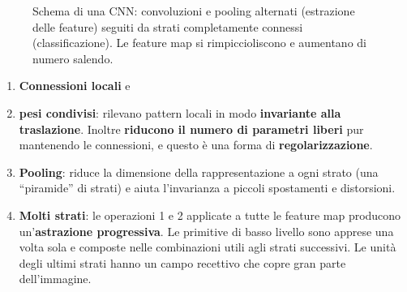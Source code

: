 \begin{figure}[ht]
\centering
{}
\caption{Schema di una CNN: convoluzioni e pooling alternati (estrazione delle feature) seguiti da strati completamente
connessi (classificazione). Le feature map si rimpiccioliscono e aumentano di numero salendo.}
\label{fig:cnn}
\end{figure}

\begin{idea}
\begin{enumerate}
  \item \textbf{Connessioni locali} e
  \item \textbf{pesi condivisi}: rilevano pattern locali in modo \textbf{invariante alla traslazione}. Inoltre
        \textbf{riducono il numero di parametri liberi} pur mantenendo le connessioni, e questo è una forma di
        \textbf{regolarizzazione}.
  \item \textbf{Pooling}: riduce la dimensione della rappresentazione a ogni strato (una ``piramide'' di strati) e
        aiuta l'invarianza a piccoli spostamenti e distorsioni.
  \item \textbf{Molti strati}: le operazioni 1 e 2 applicate a tutte le feature map producono un'\textbf{astrazione
        progressiva}. Le primitive di basso livello sono apprese una volta sola e composte nelle combinazioni utili
        agli strati successivi. Le unità degli ultimi strati hanno un campo recettivo che copre gran parte
        dell'immagine.
\end{enumerate}
\end{idea}

